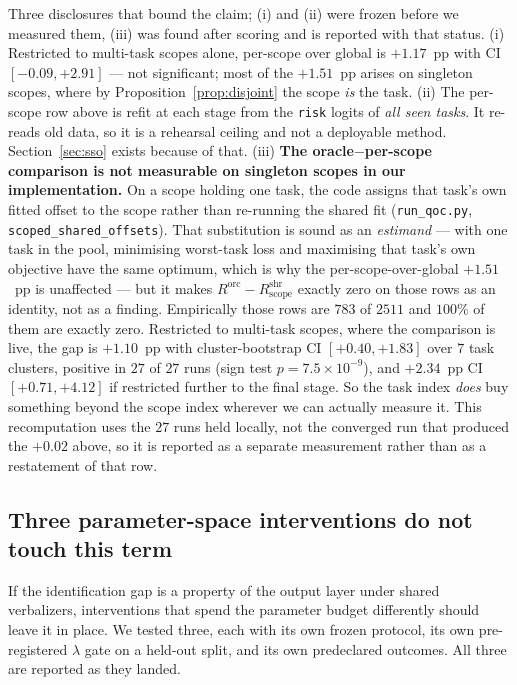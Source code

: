 Three disclosures that bound the claim; (i) and (ii) were frozen before we
measured them, (iii) was found after scoring and is reported with that status. (i)
Restricted to multi-task scopes alone, per-scope over global is $+1.17$~pp with CI
$[-0.09,+2.91]$ --- not significant; most of the $+1.51$~pp arises on singleton
scopes, where by Proposition~\ref{prop:disjoint} the scope \emph{is} the task.
(ii) The per-scope row above is refit at each stage from the \texttt{risk} logits
of \emph{all seen tasks}. It re-reads old data, so it is a rehearsal ceiling and
not a deployable method. Section~\ref{sec:sso} exists because of that.
(iii) \textbf{The oracle$-$per-scope comparison is not measurable on singleton
scopes in our implementation.} On a scope holding one task, the code assigns that
task's own fitted offset to the scope rather than re-running the shared fit
(\texttt{run\_qoc.py}, \texttt{scoped\_shared\_offsets}). That substitution is
sound as an \emph{estimand} --- with one task in the pool, minimising worst-task
loss and maximising that task's own objective have the same optimum, which is why
the per-scope-over-global $+1.51$~pp is unaffected --- but it makes
$R^{\mathrm{orc}}-R^{\mathrm{shr}}_{\mathrm{scope}}$ exactly zero on those rows
as an identity, not as a finding. Empirically those rows are $783$ of $2511$ and
$100\%$ of them are exactly zero. Restricted to multi-task scopes, where the
comparison is live, the gap is $+1.10$~pp with cluster-bootstrap CI
$[+0.40,+1.83]$ over $7$ task clusters, positive in $27$ of $27$ runs
(sign test $p=7.5\times10^{-9}$), and $+2.34$~pp CI $[+0.71,+4.12]$ if restricted
further to the final stage. So the task index \emph{does} buy something beyond the
scope index wherever we can actually measure it. This recomputation uses the $27$
runs held locally, not the converged run that produced the $+0.02$ above, so it is
reported as a separate measurement rather than as a restatement of that row.

\subsection{Three parameter-space interventions do not touch this term}
\label{sec:three-anchors}

If the identification gap is a property of the output layer under shared
verbalizers, interventions that spend the parameter budget differently should
leave it in place. We tested three, each with its own frozen protocol, its own
pre-registered $\lambda$ gate on a held-out split, and its own predeclared
outcomes. All three are reported as they landed.

